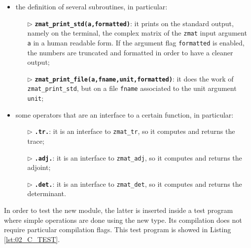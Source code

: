 \documentclass[pra, onecolumn, notitlepage, floats, 11pt]{revtex4-1}
\newcommand{\codebold}[1]{\texttt{\bfseries {\color{cobalt}#1}}}
\newcommand{\code}[1]{\texttt{#1}}
\newcommand{\codefunctionbold}[2]{\texttt{\bfseries {\color{cobalt}#1}({\color{lava}#2})}}
\begin{document}
\begin{itemize}
    \item the definition of several subroutines, in particular:
    \begin{itemize}
        \item[\( \triangleright \)] \codefunctionbold{zmat\_print\_std}{a,formatted}: it prints on the standard output, namely on the terminal, the complex matrix of the \code{zmat} input argument \code{a} in a human readable form. If the argument flag \code{formatted} is enabled, the numbers are truncated and formatted in order to have a cleaner output;
        \item[\( \triangleright \)] \codefunctionbold{zmat\_print\_file}{a,fname,unit,formatted}: it does the work of \code{zmat\_print\_std}, but on a file \code{fname} associated to the unit argument \code{unit};
    \end{itemize}

    \item some operators that are an interface to a certain function, in particular:
    \begin{itemize}
        \item[\( \triangleright \)] \codebold{.tr.}: it is an interface to \code{zmat\_tr}, so it computes and returns the trace;
        \item[\( \triangleright \)] \codebold{.adj.}: it is an interface to \code{zmat\_adj}, so it computes and returns the adjoint;
        \item[\( \triangleright \)] \codebold{.det.}: it is an interface to \code{zmat\_det}, so it computes and returns the determinant.
    \end{itemize}
\end{itemize}

In order to test the new module, the latter is inserted inside a test program where simple operations are done using the new type. Its compilation does not require particular compilation flags. This test program is showed in Listing \ref{lst:02_C_TEST}.
\end{document}
